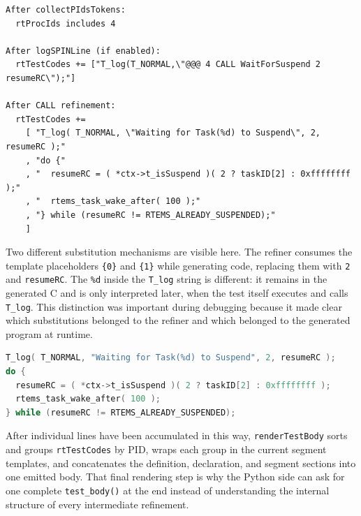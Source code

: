 \begin{lstlisting}[caption={Illustrative effect of one CALL line on the runtime state}, label={lst:waitforsuspend-state}]
After collectPIdsTokens:
  rtProcIds includes 4

After logSPINLine (if enabled):
  rtTestCodes += ["T_log(T_NORMAL,\"@@@ 4 CALL WaitForSuspend 2 resumeRC\");"]

After CALL refinement:
  rtTestCodes +=
    [ "T_log( T_NORMAL, \"Waiting for Task(%d) to Suspend\", 2, resumeRC );"
    , "do {"
    , "  resumeRC = ( *ctx->t_isSuspend )( 2 ? taskID[2] : 0xffffffff );"
    , "  rtems_task_wake_after( 100 );"
    , "} while (resumeRC != RTEMS_ALREADY_SUSPENDED);"
    ]
\end{lstlisting}

Two different substitution mechanisms are visible here. The refiner
consumes the template placeholders \texttt{\{0\}} and
\texttt{\{1\}} while generating code, replacing them with
\texttt{2} and \texttt{resumeRC}. The \texttt{\%d} inside the
\texttt{T\_log} string is different: it remains in the generated C
and is only interpreted later, when the test itself executes and calls
\texttt{T\_log}. This distinction was important during debugging
because it made clear which substitutions belonged to the refiner and
which belonged to the generated program at runtime.

\begin{lstlisting}[language=C, caption={Generated C after the WaitForSuspend template is instantiated}, label={lst:waitforsuspend-generated}]
T_log( T_NORMAL, "Waiting for Task(%d) to Suspend", 2, resumeRC );
do {
  resumeRC = ( *ctx->t_isSuspend )( 2 ? taskID[2] : 0xffffffff );
  rtems_task_wake_after( 100 );
} while (resumeRC != RTEMS_ALREADY_SUSPENDED);
\end{lstlisting}

After individual lines have been accumulated in this way,
\texttt{renderTestBody} sorts and groups \texttt{rtTestCodes} by PID,
wraps each group in the current segment templates, and concatenates
the definition, declaration, and segment sections into one emitted
body. That final rendering step is why the Python side can ask for one
complete \texttt{test\_body()} at the end instead of understanding the
internal structure of every intermediate refinement.


